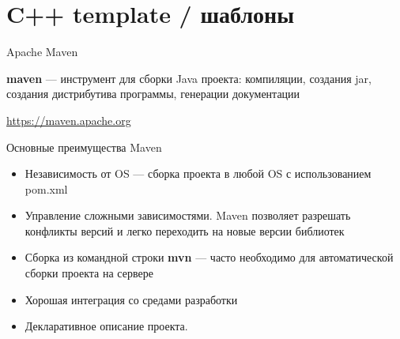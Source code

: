 \section{C++ template / шаблоны}

\begin{frame}[t]{Apache Maven}

\textbf{maven} --- инструмент для сборки Java проекта: компиляции, создания jar, создания дистрибутива программы, генерации документации

\url{https://maven.apache.org}

\end{frame}

\begin{frame}[t]{Основные преимущества Maven}
  \begin{itemize}
    \item Независимость от OS --- сборка проекта в любой OS с использованием pom.xml
    \item Управление сложными зависимостями. Maven позволяет разрешать конфликты версий и легко переходить на новые версии библиотек
    \item Сборка из командной строки \textbf{mvn} --- часто необходимо для автоматической сборки проекта на сервере
    \item Хорошая интеграция со средами разработки
    \item Декларативное описание проекта. 
  \end{itemize}
\end{frame}

